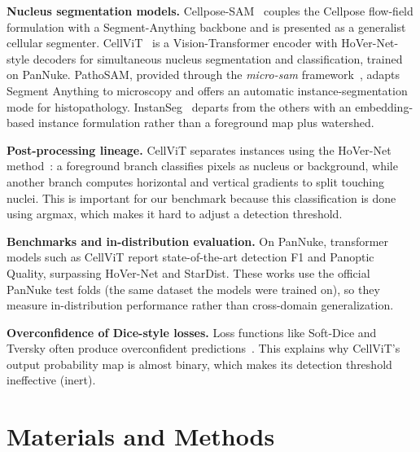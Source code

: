 \documentclass[10pt,conference]{IEEEtran}
\begin{document}
\textbf{Nucleus segmentation models.}
Cellpose-SAM~\cite{cellposesam} couples the Cellpose flow-field formulation with a
Segment-Anything backbone and is presented as a generalist cellular segmenter.
CellViT~\cite{cellvit} is a Vision-Transformer encoder with HoVer-Net-style
decoders for simultaneous nucleus segmentation and classification, trained on
PanNuke. PathoSAM, provided through the \emph{micro-sam} framework~\cite{microsam},
adapts Segment Anything to microscopy and offers an automatic instance-segmentation
mode for histopathology. InstanSeg~\cite{instanseg} departs from the others with an
embedding-based instance formulation rather than a foreground map plus watershed.

\textbf{Post-processing lineage.}
CellViT separates instances using the HoVer-Net method~\cite{hovernet}: a foreground
branch classifies pixels as nucleus or background, while another branch computes horizontal
and vertical gradients to split touching nuclei. This is important for our benchmark because
this classification is done using argmax, which makes it hard to adjust a detection threshold.

\textbf{Benchmarks and in-distribution evaluation.}
On PanNuke, transformer models such as CellViT report state-of-the-art detection
F1 and Panoptic Quality, surpassing HoVer-Net and StarDist. These works use the
official PanNuke test folds (the same dataset the models were trained on), so
they measure in-distribution performance rather than cross-domain generalization.

\textbf{Overconfidence of Dice-style losses.}
Loss functions like Soft-Dice and Tversky often produce overconfident predictions~\cite{yeung2022}.
This explains why CellViT's output probability map is almost binary, which makes its detection
threshold ineffective (inert).

\section{Materials and Methods}
\label{sec:methods}
\end{document}
